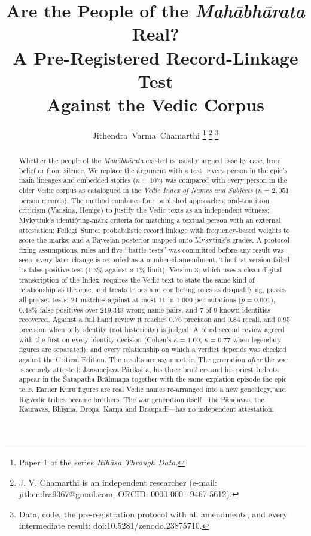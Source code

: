 \documentclass[journal]{IEEEtran}
\newcommand{\MBh}{\textit{Mahābhārata}}
\begin{document}
\title{Are the People of the \MBh{} Real?\\ A Pre-Registered Record-Linkage Test\\ Against the Vedic Corpus}

\author{Jithendra~Varma~Chamarthi%
\thanks{Paper 1 of the series \textit{Itihāsa Through Data}.}%
\thanks{J. V. Chamarthi is an independent researcher (e-mail: jithendra9367@gmail.com; ORCID: 0000-0001-9467-5612).}%
\thanks{Data, code, the pre-registration protocol with all amendments, and every intermediate result: doi:10.5281/zenodo.23875710.}}


\maketitle

\begin{abstract}
Whether the people of the \MBh{} existed is usually argued case by case, from belief or from silence.
We replace the argument with a test. Every person in the epic's main lineages and embedded stories ($n=107$)
was compared with every person in the older Vedic corpus as catalogued in the \textit{Vedic Index of Names and
Subjects} ($n=2{,}051$ person records). The method combines four published approaches: oral-tradition criticism
(Vansina, Henige) to justify the Vedic texts as an independent witness; Mykytiuk's identifying-mark criteria for
matching a textual person with an external attestation; Fellegi--Sunter probabilistic record linkage with
frequency-based weights to score the marks; and a Bayesian posterior mapped onto Mykytiuk's grades. A protocol fixing
assumptions, rules and five ``battle tests'' was committed before any result was seen; every later change is
recorded as a numbered amendment. The first version failed its false-positive test (1.3\% against a 1\% limit).
Version 3, which uses a clean digital transcription of the Index, requires the Vedic text to state the same kind of
relationship as the epic, and treats tribes and conflicting roles as disqualifying, passes all pre-set tests:
21 matches against at most 11 in 1,000 permutations ($p=0.001$), 0.48\% false positives over 219,343 wrong-name
pairs, and 7 of 9 known identities recovered. Against a full hand review it reaches 0.76 precision and 0.84 recall,
and 0.95 precision when only identity (not historicity) is judged. A blind second review agreed with the first on every
identity decision (Cohen's $\kappa=1.00$; $\kappa=0.77$ when legendary figures are separated), and every relationship on
which a verdict depends was checked against the Critical Edition. The results are asymmetric. The generation
\emph{after} the war is securely attested: Janamejaya Pārikṣita, his three brothers and his priest Indrota appear in
the Śatapatha Brāhmaṇa together with the same expiation episode the epic tells. Earlier Kuru figures are real Vedic
names re-arranged into a new genealogy, and Rigvedic tribes became brothers. The war generation itself---the
Pāṇḍavas, the Kauravas, Bhīṣma, Droṇa, Karṇa and Draupadī---has no independent attestation.
\end{abstract}
\end{document}
